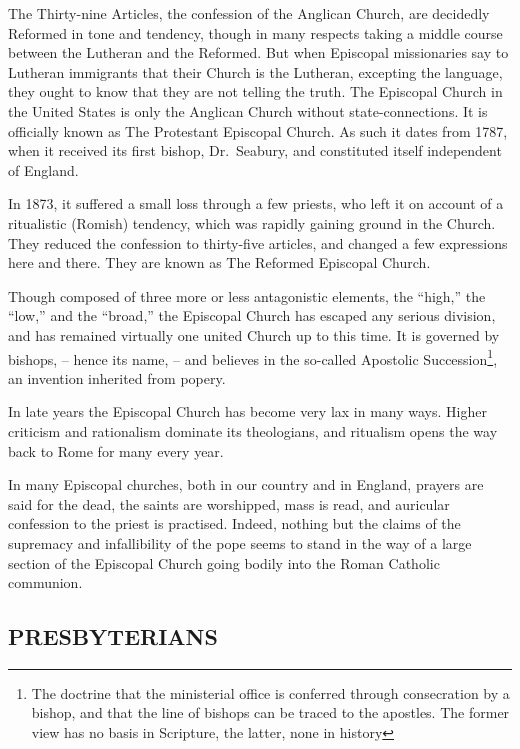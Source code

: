 \documentclass[
]{book}
\begin{document}
The Thirty-nine Articles, the confession of the Anglican Church, are decidedly Reformed in tone and tendency, though in many respects taking a middle course between the Lutheran and the Reformed. But when Episcopal missionaries say to Lutheran immigrants that their Church is the Lutheran, excepting the language, they ought to know that they are not telling the truth. The Episcopal Church in the United States is only the Anglican Church without state-connections. It is officially known as The Protestant Episcopal Church. As such it dates from 1787, when it received its first bishop, Dr.~Seabury, and constituted itself independent of England.

In 1873, it suffered a small loss through a few priests, who left it on account of a ritualistic (Romish) tendency, which was rapidly gaining ground in the Church. They reduced the confession to thirty-five articles, and changed a few expressions here and there. They are known as The Reformed Episcopal Church.

Though composed of three more or less antagonistic elements, the ``high,'' the ``low,'' and the ``broad,'' the Episcopal Church has escaped any serious division, and has remained virtually one united Church up to this time. It is governed by bishops, -- hence its name, -- and believes in the so-called Apostolic Succession\footnote{The doctrine that the ministerial office is conferred through consecration by a bishop, and that the line of bishops can be traced to the apostles. The former view has no basis in Scripture, the latter, none in history}, an invention inherited from popery.

In late years the Episcopal Church has become very lax in many ways. Higher criticism and rationalism dominate its theologians, and ritualism opens the way back to Rome for many every year.

In many Episcopal churches, both in our country and in England, prayers are said for the dead, the saints are worshipped, mass is read, and auricular confession to the priest is practised. Indeed, nothing but the claims of the supremacy and infallibility of the pope seems to stand in the way of a large section of the Episcopal Church going bodily into the Roman Catholic communion.

\subsection{\texorpdfstring{PRESBYTERIANS}{PRESBYTERIANS}}\label{presbyterians}
\end{document}
